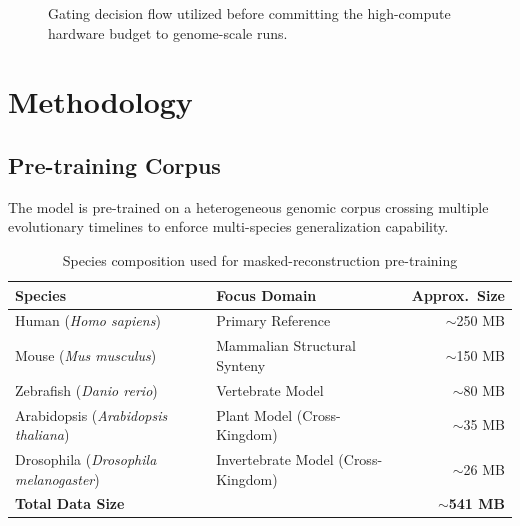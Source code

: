 \documentclass[11pt,a4paper]{article}
\begin{document}
\begin{figure}[h]
\centering
{}
\caption{Gating decision flow utilized before committing the high-compute hardware budget to genome-scale runs.}
\label{fig:decision}
\end{figure}

\newpage
\section{Methodology}
\subsection{Pre-training Corpus}
The model is pre-trained on a heterogeneous genomic corpus crossing multiple evolutionary timelines to enforce multi-species generalization capability.

\begin{table}[h]
\centering
\caption{Species composition used for masked-reconstruction pre-training}
\label{tab:corpus}
\begin{tabular}{@{}llr@{}}
\toprule
Species & Focus Domain & Approx.\ Size \\
\midrule
Human (\textit{Homo sapiens}) & Primary Reference & $\sim$250 MB \\
Mouse (\textit{Mus musculus}) & Mammalian Structural Synteny & $\sim$150 MB \\
Zebrafish (\textit{Danio rerio}) & Vertebrate Model & $\sim$80 MB \\
Arabidopsis (\textit{Arabidopsis thaliana}) & Plant Model (Cross-Kingdom) & $\sim$35 MB \\
Drosophila (\textit{Drosophila melanogaster}) & Invertebrate Model (Cross-Kingdom) & $\sim$26 MB \\
\midrule
\textbf{Total Data Size} & & \textbf{$\sim$541 MB} \\
\bottomrule
\end{tabular}
\end{table}
\end{document}
